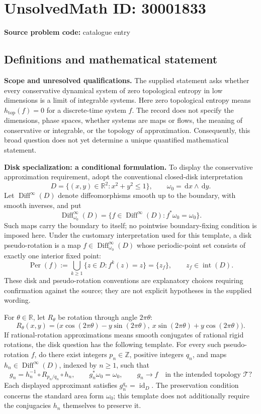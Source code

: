 \documentclass[11pt]{article}
\newcommand{\Z}{\mathbb{Z}}
\newcommand{\R}{\mathbb{R}}
\newcommand{\dd}{\,\mathrm{d}}
\begin{document}
\section*{UnsolvedMath ID: 30001833}
\textbf{Source problem code:} catalogue entry
\subsection{Definitions and mathematical statement}
\textbf{Scope and unresolved qualifications.} The supplied statement asks whether every conservative dynamical system of zero topological entropy in low dimensions is a limit of integrable systems. Here zero topological entropy means \(h_{\mathrm{top}}(f)=0\) for a discrete-time system \(f\). The record does not specify the dimensions, phase spaces, whether systems are maps or flows, the meaning of conservative or integrable, or the topology of approximation. Consequently, this broad question does not yet determine a unique quantified mathematical statement.

\textbf{Disk specialization: a conditional formulation.} To display the conservative approximation requirement, adopt the conventional closed-disk interpretation
\[
D=\{(x,y)\in\R^2:x^2+y^2\leq 1\},\qquad \omega_0=\dd x\wedge\dd y.
\]
Let \(\operatorname{Diff}^{\infty}(D)\) denote diffeomorphisms smooth up to the boundary, with smooth inverses, and put
\[
\operatorname{Diff}^{\infty}_{\omega_0}(D)
=\{f\in\operatorname{Diff}^{\infty}(D):f^*\omega_0=\omega_0\}.
\]
Such maps carry the boundary to itself; no pointwise boundary-fixing condition is imposed here. Under the customary interpretation used for this template, a disk pseudo-rotation is a map \(f\in\operatorname{Diff}^{\infty}_{\omega_0}(D)\) whose periodic-point set consists of exactly one interior fixed point:
\[
\operatorname{Per}(f):=\bigcup_{k\geq1}\{z\in D:f^k(z)=z\}=\{z_f\},\qquad z_f\in\operatorname{int}(D).
\]
These disk and pseudo-rotation conventions are explanatory choices requiring confirmation against the source; they are not explicit hypotheses in the supplied wording.

For \(\theta\in\R\), let \(R_\theta\) be rotation through angle \(2\pi\theta\):
\[
R_\theta(x,y)=\bigl(x\cos(2\pi\theta)-y\sin(2\pi\theta),\ x\sin(2\pi\theta)+y\cos(2\pi\theta)\bigr).
\]
If rational-rotation approximations means smooth conjugates of rational rigid rotations, the disk question has the following template. For every such pseudo-rotation \(f\), do there exist integers \(p_n\in\Z\), positive integers \(q_n\), and maps \(h_n\in\operatorname{Diff}^{\infty}(D)\), indexed by \(n\geq1\), such that
\[
g_n=h_n^{-1}\circ R_{p_n/q_n}\circ h_n,\qquad
g_n^*\omega_0=\omega_0,\qquad
g_n\longrightarrow f\quad\text{in the intended topology }\mathcal T?
\]
Each displayed approximant satisfies \(g_n^{q_n}=\operatorname{id}_D\). The preservation condition concerns the standard area form \(\omega_0\); this template does not additionally require the conjugacies \(h_n\) themselves to preserve it.
\end{document}
